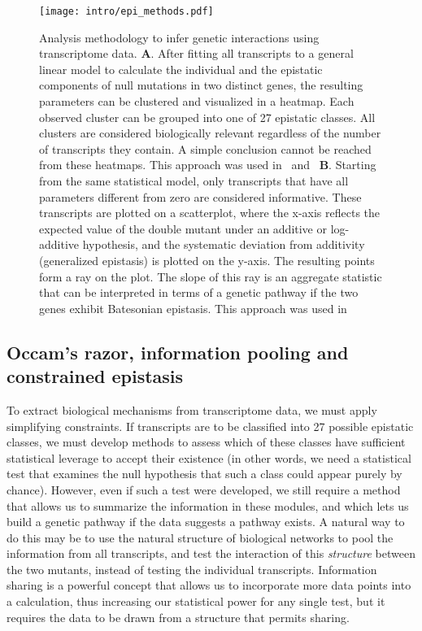 \begin{figure*}
  \centering{}
  \texttt{[image: intro/epi\_methods.pdf]}
  \caption{Analysis methodology to infer genetic interactions using
  transcriptome data.
  \textbf{A}. After fitting all transcripts to a general linear model to
  calculate the individual and the epistatic components of null mutations in two
  distinct genes, the resulting parameters can be clustered and visualized in a
  heatmap. Each observed cluster can be grouped into one of 27 epistatic
  classes. All clusters are considered biologically relevant regardless of the
  number of transcripts they contain. A simple conclusion cannot be reached
  from these heatmaps. This approach was used in~\citet{Dixit2016} and~\citet{Adamson2016}
  \textbf{B}. Starting from the same statistical model, only transcripts that
  have all parameters different from zero are considered informative. These
  transcripts are plotted on a scatterplot, where the x-axis reflects the
  expected value of the double mutant under an additive or log-additive
  hypothesis, and the systematic deviation from additivity
  (generalized epistasis) is plotted on the y-axis. The resulting points form
  a ray on the plot. The slope of this ray is an aggregate statistic that can be
  interpreted in terms of a genetic pathway if the two genes exhibit Batesonian
  epistasis. This approach was used
  in~\citet{Angeles-Albores2017,Angeles-Albores2018a}}\label{fig:stat_methods}
\end{figure*}

\subsection*{Occam's razor, information pooling and constrained epistasis}
To extract biological mechanisms from transcriptome data, we must apply
simplifying constraints. If transcripts are to be classified into 27 possible
epistatic classes, we must develop methods to assess which of these classes have
sufficient statistical leverage to accept their existence (in other words, we
need a statistical test that examines the null hypothesis that such a class
could appear purely by chance). However, even if such a test were developed, we
still require a method that allows us to summarize the information in these
modules, and which lets us build a genetic pathway if the data suggests a
pathway exists. A natural way to do this may be to use the natural structure of
biological networks to pool the information from all transcripts, and test the
interaction of this \emph{structure} between the two mutants, instead of testing
the individual transcripts. Information sharing is a powerful concept that
allows us to incorporate more data points into a calculation, thus increasing
our statistical power for any single test, but it requires the data to be drawn
from a structure that permits sharing.

